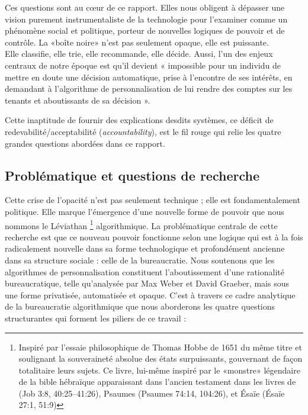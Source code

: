 Ces questions sont au cœur de ce rapport. Elles nous obligent à dépasser une vision purement instrumentaliste de la technologie pour l'examiner comme un phénomène social et politique, porteur de nouvelles logiques de pouvoir et de contrôle. La «boîte noire» n'est pas seulement opaque, elle est puissante.\\ {\large Elle classifie}, {\large elle trie}, {\LARGE elle recommande}, {\huge elle décide}. Aussi, l'un des enjeux centraux de notre époque est qu'il devient « impossible pour un individu de mettre en doute une décision automatique, prise à l'encontre de ses intérêts, en demandant à l'algorithme de personnalisation de lui rendre des comptes sur les tenants et aboutissants de sa décision ».

Cette inaptitude de fournir des explications desdits systèmes, ce déficit de redevabilité/acceptabilité (\textit{accountability}), est le fil rouge qui relie les quatre grandes questions abordées dans ce rapport.

\subsection{Problématique et questions de recherche}
Cette crise de l'opacité n'est pas seulement technique ; elle est fondamentalement politique. Elle marque l'émergence d'une nouvelle forme de pouvoir que nous nommons le Léviathan \footnote{Inspiré par l'essaie philosophique de Thomas Hobbe de 1651 du même titre et soulignant la souveraineté absolue des états surpuissants, gouvernant de façon totalitaire leurs sujets. Ce livre, lui-même inspiré par le «monstre» légendaire de la bible hébraïque apparaissant dans l'ancien testament dans les livres de (Job 3:8, 40:25–41:26), Psaumes (Psaumes 74:14, 104:26), et Ésaïe (Ésaïe 27:1, 51:9)} algorithmique. La problématique centrale de cette recherche est que ce nouveau pouvoir fonctionne selon une logique qui est à la fois radicalement nouvelle dans sa forme technologique et profondément ancienne dans sa structure sociale : celle de la bureaucratie. Nous soutenons que les algorithmes de personnalisation constituent l'aboutissement d'une rationalité bureaucratique, telle qu'analysée par Max Weber et David Graeber, mais sous une forme privatisée, automatisée et opaque. C'est à travers ce cadre analytique de la bureaucratie algorithmique que nous aborderons les quatre questions structurantes qui forment les piliers de ce travail :

